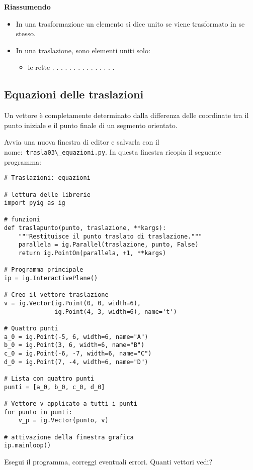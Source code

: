 \textbf{Riassumendo}
\begin{itemize} [noitemsep]
\item In una trasformazione un elemento si dice unito se viene trasformato in se
stesso.
\item In una traslazione, sono elementi uniti  solo:
\begin{itemize}
\item le rette . . . . . . . . . . . . . . .
\end{itemize}
\end{itemize}


\subsection{Equazioni delle traslazioni}

Un vettore è completamente determinato dalla differenza delle coordinate
tra il punto iniziale e il punto finale di un segmento orientato.

Avvia una nuova finestra di editor e salvarla con il
nome:~\lstinline{trasla03\_equazioni.py}.
In questa finestra ricopia il seguente programma:

\begin{lstlisting}
# Traslazioni: equazioni

# lettura delle librerie
import pyig as ig

# funzioni
def traslapunto(punto, traslazione, **kargs):
    """Restituisce il punto traslato di traslazione."""
    parallela = ig.Parallel(traslazione, punto, False)
    return ig.PointOn(parallela, +1, **kargs)

# Programma principale
ip = ig.InteractivePlane()

# Creo il vettore traslazione
v = ig.Vector(ig.Point(0, 0, width=6),
              ig.Point(4, 3, width=6), name='t')

# Quattro punti
a_0 = ig.Point(-5, 6, width=6, name="A")
b_0 = ig.Point(3, 6, width=6, name="B")
c_0 = ig.Point(-6, -7, width=6, name="C")
d_0 = ig.Point(7, -4, width=6, name="D")

# Lista con quattro punti
punti = [a_0, b_0, c_0, d_0]

# Vettore v applicato a tutti i punti
for punto in punti:
    v_p = ig.Vector(punto, v)

# attivazione della finestra grafica
ip.mainloop()
\end{lstlisting}

Esegui il programma, correggi eventuali errori. Quanti vettori vedi?

